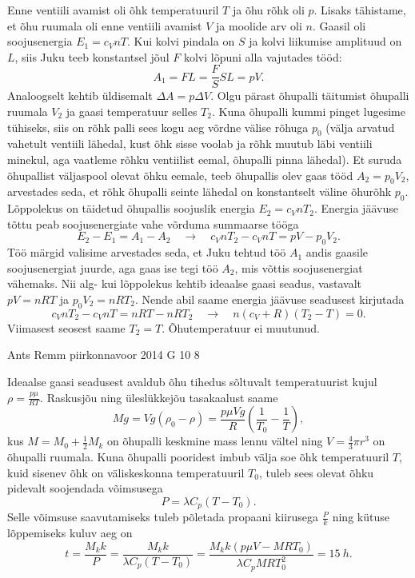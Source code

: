 \documentclass[11pt, twoside]{article}
\begin{document}
{{\ifSolution
Enne ventiili avamist oli õhk temperatuuril $T$ ja õhu rõhk oli $p$. Lisaks tähistame, et õhu ruumala oli enne ventiili avamist $V$ ja moolide arv oli $n$. Gaasil oli soojusenergia $E_1=c_VnT$. Kui kolvi pindala on $S$ ja kolvi liikumise amplituud on $L$, siis Juku teeb konstantsel jõul $F$ kolvi lõpuni alla vajutades tööd:
$$A_1=FL=\frac{F}{S}SL=pV.$$
Analoogselt kehtib üldisemalt $\Delta A = p \Delta V$. Olgu pärast õhupalli täitumist õhupalli ruumala $V_2$ ja gaasi temperatuur selles $T_2$. Kuna õhupalli kummi pinget lugesime tühiseks, siis on rõhk palli sees kogu aeg võrdne välise rõhuga $p_0$ (välja arvatud vahetult ventiili lähedal, kust õhk sisse voolab ja rõhk muutub läbi ventiili minekul, aga vaatleme rõhku ventiilist eemal, õhupalli pinna lähedal). Et suruda õhupallist väljaspool olevat õhku eemale, teeb õhupallis olev gaas tööd $A_2=p_0V_2$, arvestades seda, et rõhk õhupalli seinte lähedal on konstantselt väline õhurõhk $p_0$. Lõppolekus on täidetud õhupallis soojuslik energia $E_2=c_VnT_2$. Energia jäävuse tõttu peab soojusenergiate vahe võrduma summaarse tööga
$$E_2-E_1 = A_1-A_2 \quad\rightarrow\quad c_VnT_2-c_VnT = pV - p_0V_2.$$
Töö märgid valisime arvestades seda, et Juku tehtud töö $A_1$ andis gaasile soojusenergiat juurde, aga gaas ise tegi töö $A_2$, mis võttis soojusenergiat vähemaks. Nii alg- kui lõppolekus kehtib ideaalse gaasi seadus, vastavalt $pV=nRT$ ja $p_0V_2=nRT_2$. Nende abil saame energia jäävuse seadusest kirjutada
$$c_VnT_2-c_VnT = nRT-nRT_2 \quad\rightarrow\quad n(c_V+R)(T_2-T)=0.$$
Viimasest seosest saame $T_2=T$. Õhutemperatuur ei muutunud.
\fi
}

{Ants Remm} %
{piirkonnavoor} %
{2014} %
{G 10} %
{8} %
{

\ifSolution
Ideaalse gaasi seadusest avaldub õhu tihedus sõltuvalt temperatuurist kujul $\rho = \frac{p \mu}{R T}$. Raskusjõu ning üleslükkejõu tasakaalust saame
\[
M g = V g (\rho_0 - \rho) = \frac{p \mu V g}{R} (\frac{1}{T_0} - \frac{1}{T}),
\]
kus $M = M_0 + \frac{1}{2} M_k$ on õhupalli keskmine mass lennu vältel ning $V = \frac{4}{3} \pi r^3$ on õhupalli ruumala. Kuna õhupalli pooridest imbub välja soe õhk temperatuuril $T$, kuid sisenev õhk on väliskeskonna temperatuuril $T_0$, tuleb sees olevat õhku pidevalt soojendada võimsusega
\[
P = \lambda C_p (T - T_0).
\]
Selle võimsuse saavutamiseks tuleb põletada propaani kiirusega $\frac{P}{k}$ ning kütuse lõppemiseks kuluv aeg on
\[
t = \frac{M_k k}{P} = \frac{M_k k}{\lambda C_p (T - T_0)} = \frac{M_k k (p \mu V - M R T_0)}{\lambda C_p M R T_0^2} = \SI{15}{h}.
\]
\fi
}

}
\end{document}

